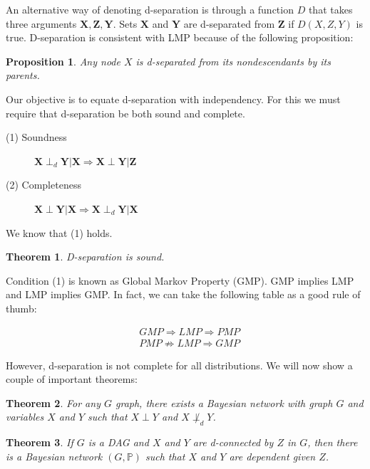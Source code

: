 \documentclass{amsart}
\theoremstyle{plain}
\newtheorem{theorem}{Theorem}
\newtheorem{proposition}{Proposition}
\newcommand{\pr}{\mathbb{P}}
\renewcommand{\implies}{\Rightarrow}
\begin{document}
An alternative way of denoting d-separation is through a function $D$ that takes three arguments
$\mathbf{X},\mathbf{Z},\mathbf{Y}$. Sets $\mathbf{X}$ and $\mathbf{Y}$ are d-separated from
$\mathbf{Z}$ if $D(X,Z,Y)$ is true. D-separation is consistent with LMP because of the following
proposition:

\begin{proposition}
  Any node $X$ is d-separated from its nondescendants by its parents.
\end{proposition}

Our objective is to equate d-separation with independency. For this we must require that
d-separation be both sound and complete.

\begin{description}
  \item[(1) Soundness] $\mathbf{X}\perp_d\mathbf{Y}|\mathbf{X}\implies\mathbf{X}\perp\mathbf{Y}|
    \mathbf{Z}$
  \item[(2) Completeness] $\mathbf{X}\perp\mathbf{Y}|\mathbf{X}\implies\mathbf{X}\perp_d\mathbf{Y}|
    \mathbf{X}$
\end{description}

We know that (1) holds.

\begin{theorem}\label{soundness}
  D-separation is sound.
\end{theorem}

Condition (1) is known as Global Markov Property (GMP). GMP implies LMP and LMP implies GMP\@. In
fact, we can take the following table as a good rule of thumb:

\begin{align*}
  &GMP \implies LMP \implies PMP\\
  &PMP \not\implies LMP \implies GMP
\end{align*}

However, d-separation is not complete for all distributions. We will now show a couple of important
theorems:

\begin{theorem}
  For any $G$ graph, there exists a Bayesian network with graph $G$ and variables $X$ and $Y$ such
  that $X\perp Y$ and $X\not\perp_d Y$.
\end{theorem}

\begin{theorem}
  If $G$ is a DAG and $X$ and $Y$ are d-connected by $Z$ in $G$, then there is a Bayesian network
  $(G,\pr)$ such that $X$ and $Y$ are dependent given $Z$.
\end{theorem}
\end{document}
